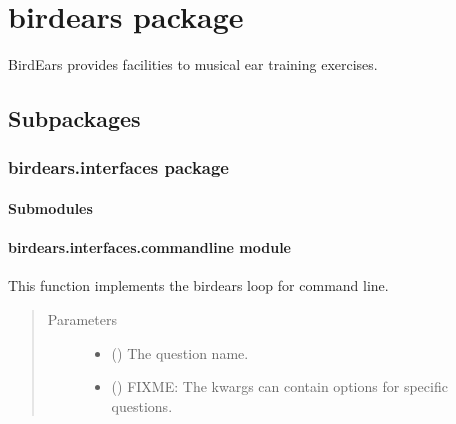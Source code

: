 \documentclass[letterpaper,10pt,english]{sphinxmanual}
\begin{document}
\chapter{birdears package}
\label{\detokenize{birdears:module-birdears}}\label{\detokenize{birdears::doc}}\label{\detokenize{birdears:birdears-package}}
BirdEars provides facilities to musical ear training exercises.


\section{Subpackages}
\label{\detokenize{birdears:subpackages}}

\subsection{birdears.interfaces package}
\label{\detokenize{birdears.interfaces:module-birdears.interfaces}}\label{\detokenize{birdears.interfaces:birdears-interfaces-package}}\label{\detokenize{birdears.interfaces::doc}}

\subsubsection{Submodules}
\label{\detokenize{birdears.interfaces:submodules}}

\subsubsection{birdears.interfaces.commandline module}
\label{\detokenize{birdears.interfaces:module-birdears.interfaces.commandline}}\label{\detokenize{birdears.interfaces:birdears-interfaces-commandline-module}}

\begin{fulllineitems}
\label{\detokenize{birdears.interfaces:birdears.interfaces.commandline.CommandLine}}
This function implements the birdears loop for command line.
\begin{quote}\begin{description}
\item[{Parameters}] \leavevmode\begin{itemize}
\item {} 
 () \textendash{} The question name.

\item {} 
 () \textendash{} FIXME: The kwargs can contain options for specific
questions.

\end{itemize}

\end{description}\end{quote}

\end{fulllineitems}
\end{document}
